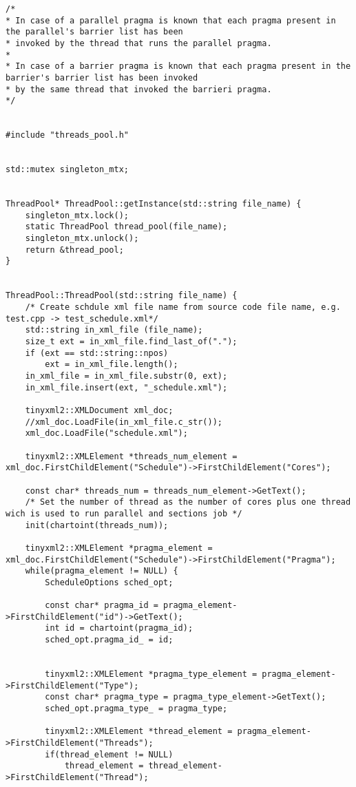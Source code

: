 \documentclass[a4paper,10pt,twoside]{book}
\begin{document}
\begin{lstlisting}[language=CCC, caption=thread\_pool.cpp]
/*
* In case of a parallel pragma is known that each pragma present in the parallel's barrier list has been
* invoked by the thread that runs the parallel pragma.
*
* In case of a barrier pragma is known that each pragma present in the barrier's barrier list has been invoked
* by the same thread that invoked the barrieri pragma.
*/


#include "threads_pool.h"


std::mutex singleton_mtx;


ThreadPool* ThreadPool::getInstance(std::string file_name) {
    singleton_mtx.lock();
    static ThreadPool thread_pool(file_name);
    singleton_mtx.unlock();
    return &thread_pool;
}


ThreadPool::ThreadPool(std::string file_name) {
    /* Create schdule xml file name from source code file name, e.g. test.cpp -> test_schedule.xml*/
    std::string in_xml_file (file_name);
    size_t ext = in_xml_file.find_last_of(".");
    if (ext == std::string::npos)
        ext = in_xml_file.length();
    in_xml_file = in_xml_file.substr(0, ext);
    in_xml_file.insert(ext, "_schedule.xml");

    tinyxml2::XMLDocument xml_doc;
    //xml_doc.LoadFile(in_xml_file.c_str());
    xml_doc.LoadFile("schedule.xml");

    tinyxml2::XMLElement *threads_num_element = xml_doc.FirstChildElement("Schedule")->FirstChildElement("Cores");

    const char* threads_num = threads_num_element->GetText();
    /* Set the number of thread as the number of cores plus one thread wich is used to run parallel and sections job */
    init(chartoint(threads_num));

    tinyxml2::XMLElement *pragma_element = xml_doc.FirstChildElement("Schedule")->FirstChildElement("Pragma");
    while(pragma_element != NULL) {
        ScheduleOptions sched_opt;

        const char* pragma_id = pragma_element->FirstChildElement("id")->GetText();
        int id = chartoint(pragma_id);
        sched_opt.pragma_id_ = id;
        

        tinyxml2::XMLElement *pragma_type_element = pragma_element->FirstChildElement("Type");
        const char* pragma_type = pragma_type_element->GetText();
        sched_opt.pragma_type_ = pragma_type;

        tinyxml2::XMLElement *thread_element = pragma_element->FirstChildElement("Threads");
        if(thread_element != NULL)
            thread_element = thread_element->FirstChildElement("Thread");
        

\end{lstlisting}
\end{document}
